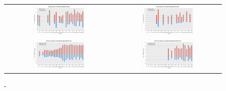 \setlength\tabcolsep{0 pt}
\begin{figure}[tb]
\centering
\begin{tabular}{c  c}
\includegraphics[width=0.5\textwidth]{figs/energy_k80.pdf} &
\includegraphics[width=0.5\textwidth]{figs/energy_tp_k80.pdf} \\
%
\includegraphics[width=0.5\textwidth]{figs/max_power_k80.pdf} &
\includegraphics[width=0.5\textwidth]{figs/max_power_tp_k80.pdf} \\

\end{tabular}





\caption{ - }
\label{fig:objective_func}

\end{figure}
